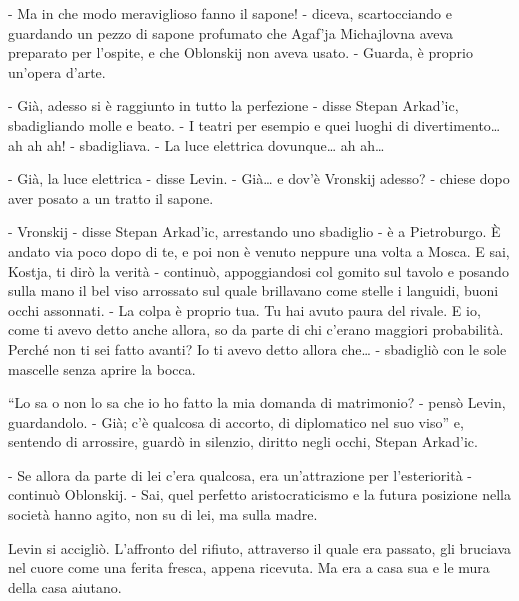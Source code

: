 - Ma in che modo meraviglioso fanno il sapone! - diceva, scartocciando e guardando un pezzo di sapone profumato che Agaf'ja Michajlovna aveva preparato per l'ospite, e che Oblonskij non aveva usato. - Guarda, è proprio un'opera d'arte. 

- Già, adesso si è raggiunto in tutto la perfezione - disse Stepan Arkad'ic, sbadigliando molle e beato. - I teatri per esempio e quei luoghi di divertimento\ldots{} ah ah ah! - sbadigliava. - La luce elettrica dovunque\ldots{} ah ah\ldots{} 

- Già, la luce elettrica - disse Levin. - Già\ldots{} e dov'è Vronskij adesso? - chiese dopo aver posato a un tratto il sapone. 

- Vronskij - disse Stepan Arkad'ic, arrestando uno sbadiglio - è a Pietroburgo. È andato via poco dopo di te, e poi non è venuto neppure una volta a Mosca. E sai, Kostja, ti dirò la verità - continuò, appoggiandosi col gomito sul tavolo e posando sulla mano il bel viso arrossato sul quale brillavano come stelle i languidi, buoni occhi assonnati. - La colpa è proprio tua. Tu hai avuto paura del rivale. E io, come ti avevo detto anche allora, so da parte di chi c'erano maggiori probabilità. Perché non ti sei fatto avanti? Io ti avevo detto allora che\ldots{} - sbadigliò con le sole mascelle senza aprire la bocca. 

``Lo sa o non lo sa che io ho fatto la mia domanda di matrimonio? - pensò Levin, guardandolo. - Già; c'è qualcosa di accorto, di diplomatico nel suo viso'' e, sentendo di arrossire, guardò in silenzio, diritto negli occhi, Stepan Arkad'ic. 

- Se allora da parte di lei c'era qualcosa, era un'attrazione per l'esteriorità - continuò Oblonskij. - Sai, quel perfetto aristocraticismo e la futura posizione nella società hanno agito, non su di lei, ma sulla madre. 

Levin si accigliò. L'affronto del rifiuto, attraverso il quale era passato, gli bruciava nel cuore come una ferita fresca, appena ricevuta. Ma era a casa sua e le mura della casa aiutano. 

